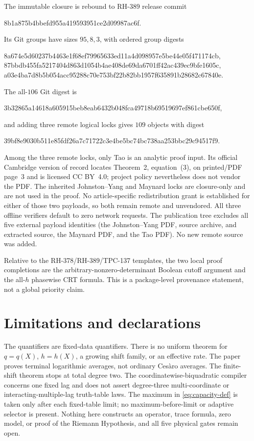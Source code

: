 \documentclass[11pt]{article}
\theoremstyle{definition}
\theoremstyle{remark}
\begin{document}
The immutable closure is rebound to RH-389 release commit
\begin{center}\small\ttfamily
8b1a875b4bbefd955a419593951ce2d09987ac6f.
\end{center}
Its Git groups have sizes \(95,8,3\), with ordered group digests
\begin{center}\small\ttfamily
8a674e5d60237b4463e1f68ef79965633ed11a4d098957e5be44e05f471174cb,\\
87bbdb455fa5217404d863d1054b4ae408de69da6701ff42ac439ec9bfe1605c,\\
a03e4ba7d8b5b054acc95288c70e753bf22b82bb1957f635891b28682c67840e.
\end{center}
The all-\(106\) Git digest is
\begin{center}\small\ttfamily
3b32865a14618a605915beb8eab6432b048fca49718b69519697ef861cbe650f,
\end{center}
and adding three remote logical locks gives \(109\) objects with digest
\begin{center}\small\ttfamily
39bf8e9030b511e85fdf26a7c71722c3e4be5bc74bc738aa253bbc29c94517f9.
\end{center}

Among the three remote locks, only Tao is an analytic proof input.  Its
official Cambridge version of record locates Theorem~2, equation~(3), on
printed/PDF page~3 and is licensed CC BY~4.0; project policy nevertheless
does not vendor the PDF.  The inherited Johnston--Yang and Maynard locks
are closure-only and are not used in the proof.  No article-specific
redistribution grant is established for either of those two payloads, so
both remain remote and unvendored.  All three offline verifiers default to
zero network requests.  The publication tree excludes all five external
payload identities (the Johnston--Yang PDF, source archive, and extracted
source, the Maynard PDF, and the Tao PDF).  No new remote source was added.

Relative to the RH-378/RH-389/TPC-137 templates, the two local proof
completions are the arbitrary-nonzero-determinant Boolean cutoff argument
and the all-\(h\) phasewise CRT formula.  This is a package-level provenance
statement, not a global priority claim.

\section{Limitations and declarations}

The quantifiers are fixed-data quantifiers.  There is no uniform theorem
for \(q=q(X)\), \(h=h(X)\), a growing shift family, or an effective rate.
The paper proves terminal logarithmic averages, not ordinary Ces\`aro
averages.  The finite-shift theorem stops at total degree two.  The
coordinatewise-biquadratic compiler concerns one fixed lag and does not
assert degree-three multi-coordinate or interacting-multiple-lag truth-table
laws.  The maximum in \eqref{eq:capacity-def} is taken only after each
fixed-table limit; no maximum-before-limit or adaptive selector is present.
Nothing here constructs an operator, trace formula, zero model, or proof of
the Riemann Hypothesis, and all five physical gates remain open.
\end{document}
